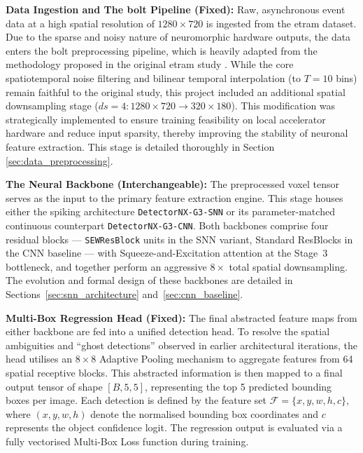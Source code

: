 \begin{enumerate}
    \item \textbf{Data Ingestion and The \gls{bolt} Pipeline (Fixed):}
    Raw, asynchronous event data at a high spatial resolution of $1280 \times 720$ is ingested from the \gls{etram} dataset.
    Due to the sparse and noisy nature of neuromorphic hardware outputs, the data enters the \gls{bolt} preprocessing pipeline, which is heavily adapted from the methodology proposed in the original \gls{etram} study \cite{Verma_2024_CVPR}.
    While the core spatiotemporal noise filtering and bilinear temporal interpolation (to $T=10$ bins) remain faithful to the original study, this project included an additional spatial downsampling stage ($ds=4: 1280 \times 720 \rightarrow 320 \times 180$).
    This modification was strategically implemented to ensure training feasibility on local accelerator hardware and reduce input sparsity, thereby improving the stability of neuronal feature extraction.
    This stage is detailed thoroughly in Section \ref{sec:data_preprocessing}.

    \begin{sloppypar}
    \item \textbf{The Neural Backbone (Interchangeable):}
    The preprocessed voxel tensor serves as the input to the primary feature extraction engine.
    This stage houses either the spiking architecture \texttt{DetectorNX-G3-SNN} or its parameter-matched continuous counterpart \texttt{DetectorNX-G3-CNN}.
    Both backbones comprise four residual blocks --- \texttt{SEWResBlock} units in the SNN variant, Standard ResBlocks in the CNN baseline --- with Squeeze-and-Excitation attention at the Stage~3 bottleneck, and together perform an aggressive $8\times$ total spatial downsampling.
    The evolution and formal design of these backbones are detailed in Sections~\ref{sec:snn_architecture} and~\ref{sec:cnn_baseline}.
    \end{sloppypar}

    \item \textbf{Multi-Box Regression Head (Fixed):} 
    The final abstracted feature maps from either backbone are fed into a unified detection head. 
    To resolve the spatial ambiguities and ``ghost detections'' observed in earlier architectural iterations, the head utilises an $8 \times 8$ Adaptive Pooling mechanism to aggregate features from 64 spatial receptive blocks.
    This abstracted information is then mapped to a final output tensor of shape $[B, 5, 5]$, representing the top 5 predicted bounding boxes per image. 
    Each detection is defined by the feature set $\mathcal{F} = \{x, y, w, h, c\}$, where $(x, y, w, h)$ denote the normalised bounding box coordinates and $c$ represents the object confidence logit.
    The regression output is evaluated via a fully vectorised Multi-Box Loss function during training.


\end{enumerate}
